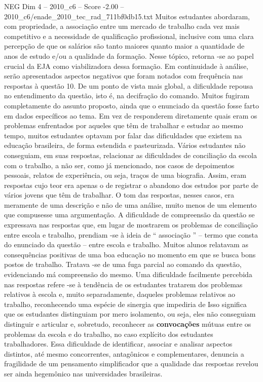 \begin{textsample}{NEG Dim 4 – 2010\_c6 – Score -2.00 – 2010\_c6/enade\_2010\_tec\_rad\_711bf0db15.txt}
Muitos estudantes abordaram, com propriedade, a associação entre um mercado de trabalho cada vez mais competitivo e a necessidade de qualificação profissional, inclusive com uma clara percepção de que os salários são tanto maiores quanto maior a quantidade de anos de estudo e/ou a qualidade da formação.
Nesse tópico, retorna -se ao papel crucial da EJA como viabilizadora dessa formação.
Em continuidade à análise, serão apresentados aspectos negativos que foram notados com frequência nas respostas à questão 10.
De um ponto de vista mais global, a dificuldade repousa no entendimento da questão, isto é, na decifração do comando.
Muitos fugiram completamente do assunto proposto, ainda que o enunciado da questão fosse farto em dados específicos ao tema.
Em vez de responderem diretamente quais eram os problemas enfrentados por aqueles que têm de trabalhar e estudar ao mesmo tempo, muitos estudantes optavam por falar das dificuldades que existem na educação brasileira, de forma estendida e pasteurizada.
Vários estudantes não conseguiam, em suas respostas, relacionar as dificuldades de conciliação da escola com o trabalho, a não ser, como já mencionado, nos casos de depoimentos pessoais, relatos de experiência, ou seja, traços de uma biografia.
Assim, eram respostas cujo teor era apenas o de registrar o abandono dos estudos por parte de vários jovens que têm de trabalhar.
O tom das respostas, nesses casos, era meramente de uma descrição e não de uma análise, muito menos de um elemento que compusesse uma argumentação.
A dificuldade de compreensão da questão se expressava nas respostas que, em lugar de mostrarem os problemas de conciliação entre escola e trabalho, prendiam -se à ideia de “ associação ” – termo que consta do enunciado da questão – entre escola e trabalho.
Muitos alunos relatavam as consequências positivas de uma boa educação no momento em que se busca bons postos de trabalho.
Tratava -se de uma fuga parcial ao comando da questão, evidenciando má compreensão do mesmo.
Uma dificuldade facilmente percebida nas respostas refere -se à tendência de os estudantes tratarem dos problemas relativos à escola e, muito separadamente, daqueles problemas relativos ao trabalho, reconhecendo uma espécie de sinergia que impediria de Isso significa que os estudantes distinguiam por mero isolamento, ou seja, eles não conseguiam distinguir e articular e, sobretudo, reconhecer as \textbf{convocações} mútuas entre os problemas da escola e do trabalho, no caso explícito dos estudantes trabalhadores.
Essa dificuldade de identificar, associar e analisar aspectos distintos, até mesmo concorrentes, antagônicos e complementares, denuncia a fragilidade de um pensamento simplificador que a qualidade das respostas revelou ser ainda hegemônico nas universidades brasileiras.

\end{textsample}
